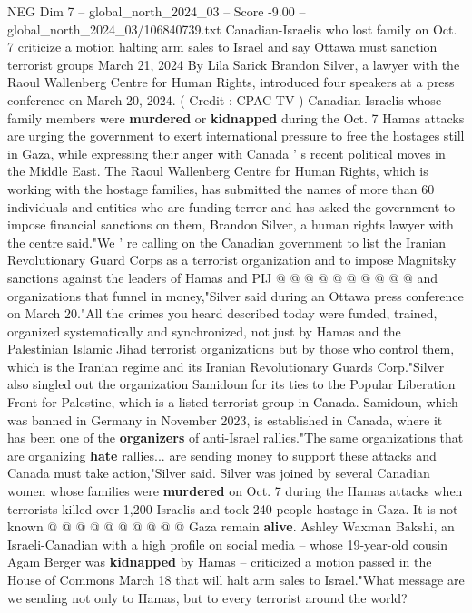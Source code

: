 \begin{textsample}{NEG Dim 7 – global\_north\_2024\_03 – Score -9.00 – global\_north\_2024\_03/106840739.txt}  \label{ex:f7_neg_232}
Canadian-Israelis who lost family on Oct. 7 criticize a motion halting arm sales to Israel and say Ottawa must sanction terrorist groups March 21, 2024 By Lila Sarick Brandon Silver, a lawyer with the Raoul Wallenberg Centre for Human Rights, introduced four speakers at a press conference on March 20, 2024. ( Credit : CPAC-TV ) Canadian-Israelis whose family members were \textbf{murdered} or \textbf{kidnapped} during the Oct. 7 Hamas attacks are urging the government to exert international pressure to free the hostages still in Gaza, while expressing their anger with Canada ' s recent political moves in the Middle East.
The Raoul Wallenberg Centre for Human Rights, which is working with the hostage families, has submitted the names of more than 60 individuals and entities who are funding terror and has asked the government to impose financial sanctions on them, Brandon Silver, a human rights lawyer with the centre said."We ' re calling on the Canadian government to list the Iranian Revolutionary Guard Corps as a terrorist organization and to impose Magnitsky sanctions against the leaders of Hamas and PIJ @ @ @ @ @ @ @ @ @ @ and organizations that funnel in money,"Silver said during an Ottawa press conference on March 20."All the crimes you heard described today were funded, trained, organized systematically and synchronized, not just by Hamas and the Palestinian Islamic Jihad terrorist organizations but by those who control them, which is the Iranian regime and its Iranian Revolutionary Guards Corp."Silver also singled out the organization Samidoun for its ties to the Popular Liberation Front for Palestine, which is a listed terrorist group in Canada.
Samidoun, which was banned in Germany in November 2023, is established in Canada, where it has been one of the \textbf{organizers} of anti-Israel rallies."The same organizations that are organizing \textbf{hate} rallies... are sending money to support these attacks and Canada must take action,"Silver said.
Silver was joined by several Canadian women whose families were \textbf{murdered} on Oct. 7 during the Hamas attacks when terrorists killed over 1,200 Israelis and took 240 people hostage in Gaza.
It is not known @ @ @ @ @ @ @ @ @ @ Gaza remain \textbf{alive}.
Ashley Waxman Bakshi, an Israeli-Canadian with a high profile on social media -- whose 19-year-old cousin Agam Berger was \textbf{kidnapped} by Hamas -- criticized a motion passed in the House of Commons March 18 that will halt arm sales to Israel."What message are we sending not only to Hamas, but to every terrorist around the world?

\end{textsample}
